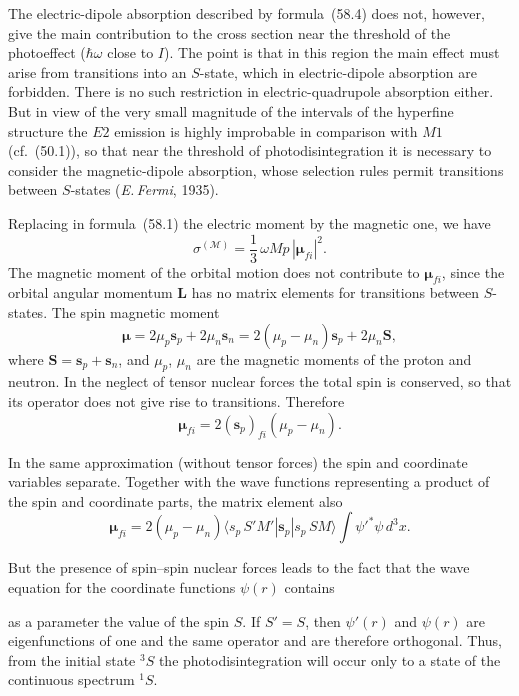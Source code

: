 The electric-dipole absorption described by formula~(58.4) does not, however, give the main contribution to the cross section near the threshold of the photoeffect ($\hbar\omega$ close to $I$). The point is that in this region the main effect must arise from transitions into an $S$-state, which in electric-dipole absorption are forbidden. There is no such restriction in electric-quadrupole absorption either. But in view of the very small magnitude of the intervals of the hyperfine structure the $E2$ emission is highly improbable in comparison with $M1$ (cf.~(50.1)), so that near the threshold of photodisintegration it is necessary to consider the magnetic-dipole absorption, whose selection rules permit transitions between $S$-states (\textit{E.\,Fermi}, 1935).

Replacing in formula~(58.1) the electric moment by the magnetic one, we have
\begin{equation}
\sigma^{(\mathscr{M})} = \frac{1}{3}\,\omega Mp\,|\boldsymbol{\mu}_{fi}|^2.
\tag{58.5}
\end{equation}
The magnetic moment of the orbital motion does not contribute to $\boldsymbol{\mu}_{fi}$, since the orbital angular momentum $\mathbf{L}$ has no matrix elements for transitions between $S$-states. The spin magnetic moment
\[
\boldsymbol{\mu} = 2\mu_p\mathbf{s}_p + 2\mu_n\mathbf{s}_n = 2(\mu_p - \mu_n)\mathbf{s}_p + 2\mu_n\mathbf{S},
\]
where $\mathbf{S} = \mathbf{s}_p + \mathbf{s}_n$, and $\mu_p$, $\mu_n$ are the magnetic moments of the proton and neutron. In the neglect of tensor nuclear forces the total spin is conserved, so that its operator does not give rise to transitions. Therefore
\[
\boldsymbol{\mu}_{fi} = 2(\mathbf{s}_p)_{fi}(\mu_p - \mu_n).
\]

In the same approximation (without tensor forces) the spin and coordinate variables separate. Together with the wave functions representing a product of the spin and coordinate parts, the matrix element also
\[
\boldsymbol{\mu}_{fi} = 2(\mu_p - \mu_n)\langle s_p\,S'M'|\mathbf{s}_p|s_p\,SM\rangle\int\psi'^*\psi\,d^3x.
\]

But the presence of spin--spin nuclear forces leads to the fact that the wave equation for the coordinate functions $\psi(r)$ contains

as a parameter the value of the spin $S$. If $S' = S$, then $\psi'(r)$ and $\psi(r)$ are eigenfunctions of one and the same operator and are therefore orthogonal. Thus, from the initial state $^3S$ the photodisintegration will occur only to a state of the continuous spectrum $^1S$.

